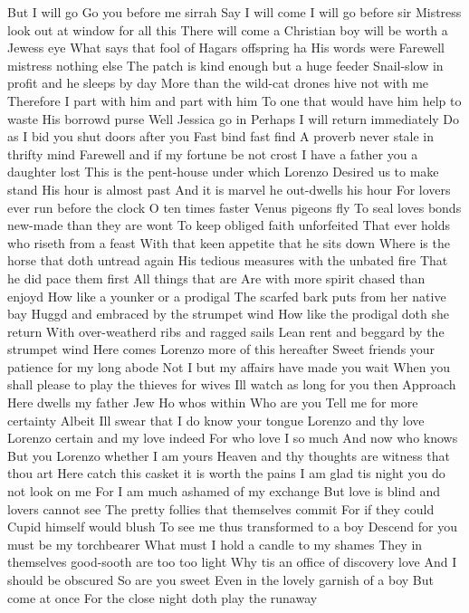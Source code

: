 But I will go Go you before me sirrah
Say I will come
I will go before sir Mistress look out at
window for all this There will come a Christian
boy will be worth a Jewess eye
What says that fool of Hagars offspring ha
His words were Farewell mistress nothing else
The patch is kind enough but a huge feeder
Snail-slow in profit and he sleeps by day
More than the wild-cat drones hive not with me
Therefore I part with him and part with him
To one that would have him help to waste
His borrowd purse Well Jessica go in
Perhaps I will return immediately
Do as I bid you shut doors after you
Fast bind fast find
A proverb never stale in thrifty mind
Farewell and if my fortune be not crost
I have a father you a daughter lost
This is the pent-house under which Lorenzo
Desired us to make stand
His hour is almost past
And it is marvel he out-dwells his hour
For lovers ever run before the clock
O ten times faster Venus pigeons fly
To seal loves bonds new-made than they are wont
To keep obliged faith unforfeited
That ever holds who riseth from a feast
With that keen appetite that he sits down
Where is the horse that doth untread again
His tedious measures with the unbated fire
That he did pace them first All things that are
Are with more spirit chased than enjoyd
How like a younker or a prodigal
The scarfed bark puts from her native bay
Huggd and embraced by the strumpet wind
How like the prodigal doth she return
With over-weatherd ribs and ragged sails
Lean rent and beggard by the strumpet wind
Here comes Lorenzo more of this hereafter
Sweet friends your patience for my long abode
Not I but my affairs have made you wait
When you shall please to play the thieves for wives
Ill watch as long for you then Approach
Here dwells my father Jew Ho whos within
Who are you Tell me for more certainty
Albeit Ill swear that I do know your tongue
Lorenzo and thy love
Lorenzo certain and my love indeed
For who love I so much And now who knows
But you Lorenzo whether I am yours
Heaven and thy thoughts are witness that thou art
Here catch this casket it is worth the pains
I am glad tis night you do not look on me
For I am much ashamed of my exchange
But love is blind and lovers cannot see
The pretty follies that themselves commit
For if they could Cupid himself would blush
To see me thus transformed to a boy
Descend for you must be my torchbearer
What must I hold a candle to my shames
They in themselves good-sooth are too too light
Why tis an office of discovery love
And I should be obscured
So are you sweet
Even in the lovely garnish of a boy
But come at once
For the close night doth play the runaway

